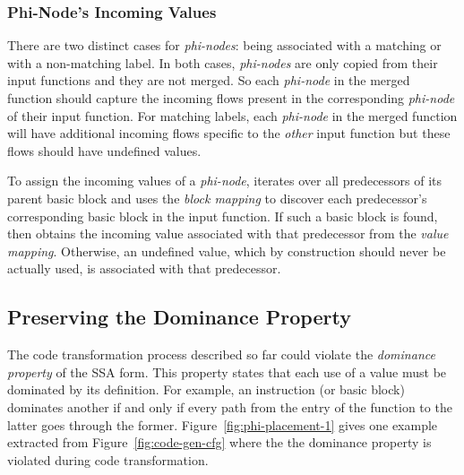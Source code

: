 \subsubsection{Phi-Node's Incoming Values} \label{sec:phi-in-vals}

There are two distinct cases for \textit{phi-nodes}: being associated with a
matching or with a non-matching label. In both cases, \textit{phi-nodes} are
only copied from their input functions and they are not merged. So each
\textit{phi-node} in the merged function should capture the incoming flows
present in the corresponding \textit{phi-node} of their input function. For
matching labels, each \textit{phi-node} in the merged function will have
additional incoming flows specific to the \textit{other} input function but
these flows should have undefined values.

To assign the incoming values of a \textit{phi-node}, {\ProjName} iterates over
all predecessors of its parent basic block and uses the \textit{block mapping}
to discover each predecessor's corresponding basic block in the input function.
If such a basic block is found, then
{\ProjName} obtains the incoming value associated with that predecessor from the \textit{value mapping}.
Otherwise, an undefined value, which by construction should never be actually used,
is associated with that predecessor.

\subsection{Preserving the Dominance Property} \label{sec:ssa-fix}
%
The code transformation process described so far could violate the \textit{dominance property} of the SSA form. This property states that
each use of a value must be dominated by its definition. For example, an instruction (or basic block) dominates another if and only if
every path from the entry of the function to the latter goes through the former. Figure~\ref{fig:phi-placement-1} gives one example
extracted from Figure~\ref{fig:code-gen-cfg} where the the dominance property is violated during code transformation.

